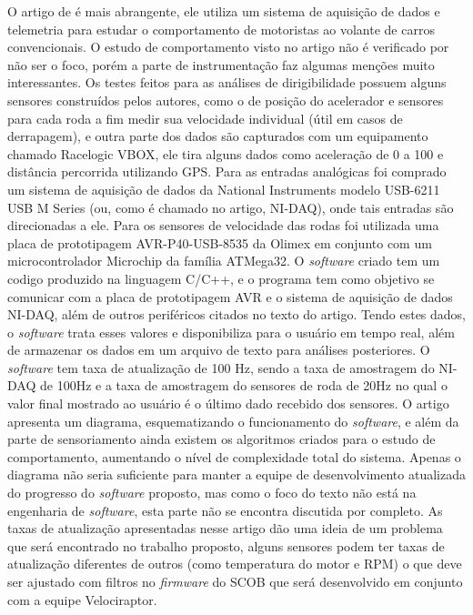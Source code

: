 O artigo de  é mais abrangente, ele utiliza um sistema de aquisição de dados e telemetria para estudar o comportamento de motoristas ao volante de carros convencionais. O estudo de comportamento visto no artigo não é verificado por não ser o foco, porém a parte de instrumentação faz algumas menções muito interessantes. Os testes feitos para as análises de dirigibilidade possuem alguns sensores construídos pelos autores, como o de posição do acelerador e sensores para cada roda a fim medir sua velocidade individual (útil em casos de derrapagem), e outra parte dos dados são capturados com um equipamento chamado Racelogic VBOX, ele tira alguns dados como aceleração de 0 a 100 e distância percorrida utilizando GPS. Para as entradas analógicas foi comprado um sistema de aquisição de dados da National Instruments modelo USB-6211 USB M Series (ou, como é chamado no artigo, NI-DAQ), onde tais entradas são direcionadas a ele. Para os sensores de velocidade das rodas foi utilizada uma placa de prototipagem AVR-P40-USB-8535 da Olimex em conjunto com um microcontrolador Microchip da família ATMega32. O \textit{software} criado tem um codigo produzido na linguagem C/C++, e o programa tem como objetivo se comunicar com a placa de prototipagem AVR e o sistema de aquisição de dados NI-DAQ, além de outros periféricos citados no texto do artigo. Tendo estes dados, o \textit{software} trata esses valores e disponibiliza para o usuário em tempo real, além de armazenar os dados em um arquivo de texto para análises posteriores. O \textit{software} tem taxa de atualização de 100 Hz, sendo a taxa de amostragem do NI-DAQ de 100Hz e a taxa de amostragem do sensores de roda de 20Hz no qual o valor final mostrado ao usuário é o último dado recebido dos sensores. O artigo apresenta um diagrama, esquematizando o funcionamento do \textit{software}, e além da parte de sensoriamento ainda existem os algoritmos criados para o estudo de comportamento, aumentando o nível de complexidade total do sistema. Apenas o diagrama não seria suficiente para manter a equipe de desenvolvimento atualizada do progresso do \textit{software} proposto, mas como o foco do texto não está na engenharia de \textit{software}, esta parte não se encontra discutida por completo. As taxas de atualização apresentadas nesse artigo dão uma ideia de um problema que será encontrado no trabalho proposto, alguns sensores podem ter taxas de atualização diferentes de outros (como temperatura do motor e RPM) o que deve ser ajustado com filtros no \textit{firmware} do SCOB que será desenvolvido em conjunto com a equipe Velociraptor.


